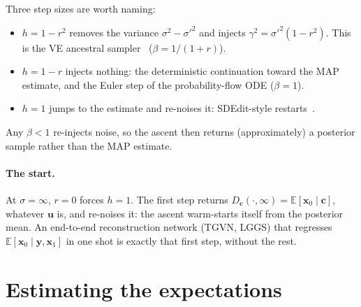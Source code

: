 \documentclass[11pt]{article}
\theoremstyle{remark}
\newcommand{\x}{\bm{x}}
\newcommand{\y}{\bm{y}}
\newcommand{\uu}{\bm{u}}
\newcommand{\cc}{\bm{c}}
\newcommand{\E}{\mathbb{E}}
\begin{document}
\noindent Three step sizes are worth naming:
\begin{itemize}[leftmargin=1.5em, itemsep=1pt]
  \item $h = 1-r^2$ removes the variance $\sigma^2-\sigma'^2$ and injects
        $\gamma^2 = \sigma'^2(1-r^2)$. This is the VE ancestral sampler~\cite{song2021}
        ($\beta = 1/(1+r)$).
  \item $h = 1-r$ injects nothing: the deterministic continuation toward the MAP estimate, and the
        Euler step of the probability-flow ODE ($\beta=1$).
  \item $h=1$ jumps to the estimate and re-noises it: SDEdit-style restarts~\cite{meng2022}.
\end{itemize}
Any $\beta<1$ re-injects noise, so the ascent then returns (approximately) a posterior sample
rather than the MAP estimate.

\paragraph{The start.} At $\sigma=\infty$, $r=0$ forces $h=1$. The first step returns
$D_{\cc}(\cdot,\infty) = \E[\x_0\mid\cc]$, whatever $\uu$ is, and re-noises it: the ascent
warm-starts itself from the posterior mean. An end-to-end reconstruction network (TGVN, LGGS)
that regresses $\E[\x_0\mid\y,\x_1]$ in one shot is exactly that first step, without the rest.

\section{Estimating the expectations}\label{sec:estimators}
\end{document}
